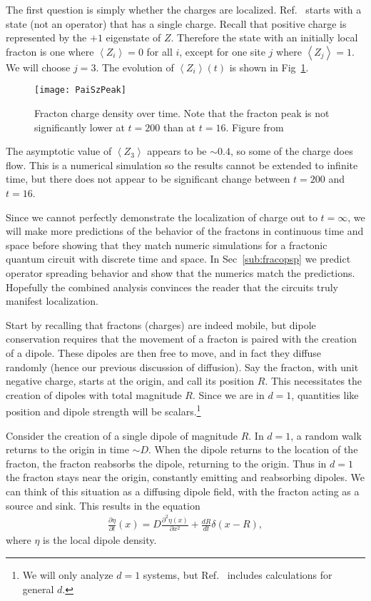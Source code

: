 \documentclass[a4paper,11pt]{article}
\newcommand{\pd}[2]{\frac{\partial #1}{\partial #2}}
\newcommand{\pdn}[3]{\frac{\partial^{#3} #1}{\partial #2^{#3}}}
\newcommand{\nd}[2]{\frac{d #1}{d #2}}
\newcommand{\ex}[1]{\left\langle #1 \right\rangle}
\begin{document}
The first question is simply whether the charges are localized. Ref.~\cite{PaiFracton} starts with a state (not an operator) that has a single charge. 
Recall that positive charge is represented by the $+1$ eigenstate of $Z$. Therefore the state with an initially local fracton is one where $\ex{Z_i}=0$ for all $i$, except for one site $j$ where $\ex{Z_j}=1$. We will choose $j=3$.
The evolution of $\ex{Z_i}(t)$ is shown in Fig~\ref{fig:PaiSzPeak}.
\begin{figure}
	\centering
	\texttt{[image: PaiSzPeak]}
	\caption{Fracton charge density over time. Note that the fracton peak is not significantly lower at $t=200$ than at $t=16$. Figure from~\cite{PaiFracton}}
	\label{fig:PaiSzPeak}
\end{figure}
The asymptotic value of $\ex{Z_3}$ appears to be $\sim0.4$, so some of the charge does flow. This is a numerical simulation so the results cannot be extended to infinite time, but there does not appear to be significant change between $t=200$ and $t=16$.

Since we cannot perfectly demonstrate the localization of charge out to $t=\infty$, we will make more predictions of the behavior of the fractons in continuous time and space before showing that they match numeric simulations for a fractonic quantum circuit with discrete time and space. In Sec~\ref{sub:fracopsp} we predict operator spreading behavior and show that the numerics match the predictions. Hopefully the combined analysis convinces the reader that the circuits truly manifest localization.

Start by recalling that fractons (charges) are indeed mobile, but dipole conservation requires that the movement of a fracton is paired with the creation of a dipole. These dipoles are then free to move, and in fact they diffuse randomly (hence our previous discussion of diffusion). Say the fracton, with unit negative charge, starts at the origin, and call its position $R$. This necessitates the creation of dipoles with total magnitude $R$. Since we are in $d=1$, quantities like position and dipole strength will be scalars.\footnote{We will only analyze $d=1$ systems, but Ref.~\cite{PaiFracton} includes calculations for general $d$.}

Consider the creation of a single dipole of magnitude $R$. In $d=1$, a random walk returns to the origin in time $\sim D$.  When the dipole returns to the location of the fracton, the fracton reabsorbs the dipole, returning to the origin. Thus in $d=1$ the fracton stays near the origin, constantly emitting and reabsorbing dipoles. We can think of this situation as a diffusing dipole field, with the fracton acting as a source and sink. This results in the equation
\begin{align}
\pd{\eta}{t}(x) = D\pdn{\eta(x)}{x}{2} + \nd{R}{t}\delta(x-R),
\end{align}
where $\eta$ is the local dipole density.
\end{document}
